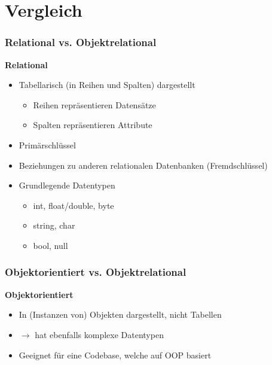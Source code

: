 \section{Vergleich}

\begin{frame}
    \frametitle{Relational vs. Objektrelational}

        \textbf{Relational}
        \pause
        \begin{itemize}
            \item \alert{Tabellarisch} (in Reihen und Spalten) dargestellt \pause
            \begin{itemize}
                \item Reihen repräsentieren Datensätze
                \item Spalten repräsentieren Attribute
            \end{itemize}
            \pause
            \item Primärschlüssel \pause
            \item Beziehungen zu anderen relationalen Datenbanken (Fremdschlüssel) \pause
            \item Grundlegende Datentypen \pause
            \begin{itemize}
                \item int, float/double, byte \pause
                \item string, char \pause
                \item bool, null \pause
            \end{itemize}
        \end{itemize}

\end{frame}

\begin{frame}
    \frametitle{Objektorientiert vs. Objektrelational}

    \textbf{Objektorientiert}
    \pause
    \begin{itemize}
        \item In (Instanzen von) \alert{Objekten} dargestellt, nicht Tabellen \pause
        \item $\rightarrow$ hat ebenfalls \alert{komplexe Datentypen} \pause
        \item Geeignet für eine Codebase, welche auf OOP basiert \pause
    \end{itemize}

\end{frame}

